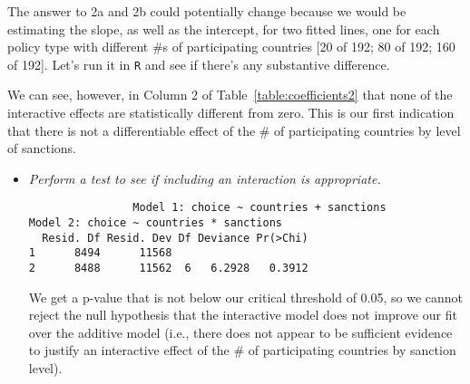 \documentclass[12pt,letterpaper]{article}
\begin{document}
\begin{enumerate}
\begin{enumerate}
		The answer to 2a and 2b could potentially change because we would be estimating the slope, as well as the intercept, for two fitted lines, one for each policy type with different \#s of participating countries [20 of 192; 80 of 192; 160 of 192]. Let’s run it in \texttt{R} and see if there’s any substantive difference.
		
					 
		
		We can see, however, in Column 2 of Table~\ref{table:coefficients2} that none of the interactive effects are statistically different from zero. This is our first indication that there is not a differentiable effect of the \# of participating countries by level of sanctions.
	
	
		\begin{itemize}
			\item \textit{Perform a test to see if including an interaction is appropriate.}
			
			 
			
			\begin{verbatim}
				Model 1: choice ~ countries + sanctions
Model 2: choice ~ countries * sanctions
  Resid. Df Resid. Dev Df Deviance Pr(>Chi)
1      8494      11568                     
2      8488      11562  6   6.2928   0.3912
			\end{verbatim}
		

			We get a p-value that is not below our critical threshold of 0.05, so we cannot reject the null hypothesis that the interactive model does not improve our fit over the additive model (i.e., there does not appear to be sufficient evidence to justify an interactive effect of the \# of participating countries by sanction level).
			
		\end{itemize}
	\end{enumerate}
	\clearpage


\end{enumerate}
\end{document}
